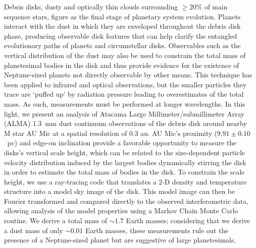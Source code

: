 \documentclass[12 pt, letterpaper]{article}
\begin{document}
\abstract
  Debris disks, dusty and optically thin clouds surrounding $\geq 20\%$ of main sequence stars, figure as the final stage of planetary system evolution. 
  Planets interact with the dust in which they are enveloped throughout the debris disk phase, producing observable disk features that can help clarify the entangled evolutionary paths of planets and circumstellar disks. 
  Observables such as the vertical distribution of the dust may also be used to constrain the total mass of planetesimal bodies in the disk and thus provide evidence for the existence of Neptune-sized planets not directly observable by other means. 
  This technique has been applied to infrared and optical observations, but the smaller particles they trace are `puffed up' by radiation pressure leading to overestimates of the total mass. 
  As such, measurements must be performed at longer wavelengths. 
  In this light, we present an analysis of Atacama Large Millimeter/submillimeter Array (ALMA) 1.3~mm dust continuum observations of the debris disk around nearby M star AU Mic at a spatial resolution of 0.3 au.
  AU Mic's proximity ($9.91 \pm 0.10$~pc) and edge-on inclination provide a favorable opportunity to measure the disks's vertical scale height, which can be related to the size-dependent particle velocity distribution induced by the largest bodies dynamically stirring the disk in order to estimate the total mass of bodies in the disk. 
  To constrain the scale height, we use a ray-tracing code that translates a 2-D density and temperature structure into a model sky image of the disk. 
  This model image can then be Fourier transformed and compared directly to the observed interferometric data, allowing analysis of the model properties using a Markov Chain Monte Carlo routine.
  We derive a total mass of $\sim1.7$ Earth masses; considering that we derive a dust mass of only $\sim0.01$ Earth masses, these measurements rule out the presence of a Neptune-sized planet but are suggestive of large planetesimals.
\end{document}
